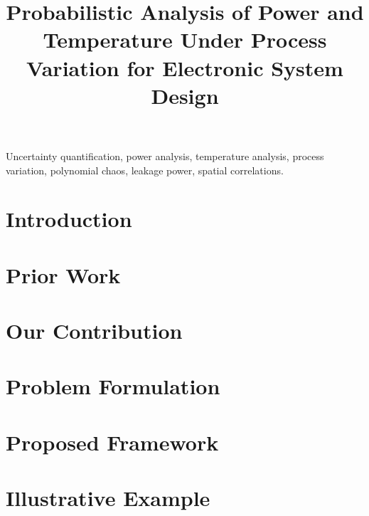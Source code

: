 \documentclass[journal]{IEEEtran}
\begin{document}
  

  \title{\TitleFont Probabilistic Analysis of Power and Temperature Under Process Variation for Electronic System Design}

  \author{
    
  }

  \maketitle

  \begin{abstract}
    
  \end{abstract}

  \begin{IEEEkeywords}
    Uncertainty quantification, power analysis, temperature analysis, process variation, polynomial chaos, leakage power, spatial correlations.
  \end{IEEEkeywords}

  \section{Introduction} 
  

  \section{Prior Work} 
  

  \section{Our Contribution} 
  

  \section{Problem Formulation} 
  

  \section{Proposed Framework} 
  

  \section{Illustrative Example} 
  
\end{document}
